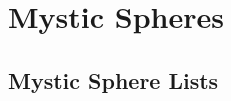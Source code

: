 \chapter{Mystic Spheres}\label{Mystic Spheres}

\section{Mystic Sphere Lists}\label{Mystic Sphere Lists}

    

    
